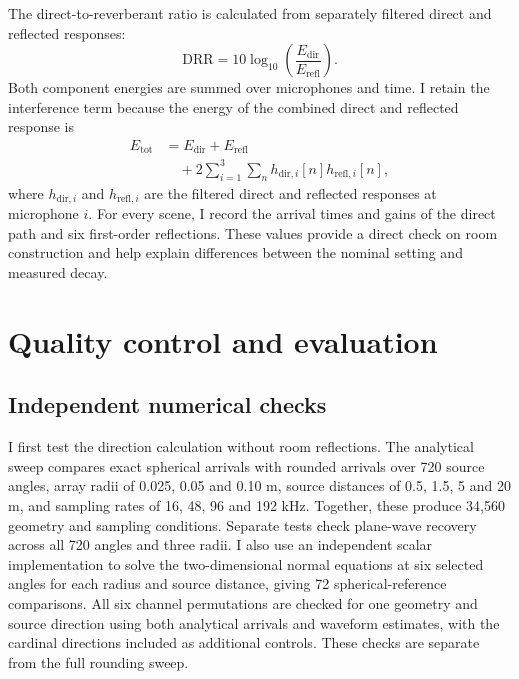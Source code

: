\documentclass{edpsci}
\begin{document}
The direct-to-reverberant ratio is calculated from separately filtered direct and reflected responses:
\begin{equation}
	\mathrm{DRR}
	=
	10\log_{10}
	\left(
	\frac{E_{\mathrm{dir}}}{E_{\mathrm{refl}}}
	\right).
\end{equation}
Both component energies are summed over microphones and time. I retain the interference term because the energy of the combined direct and reflected response is
\begin{equation}
	\begin{aligned}
	E_{\mathrm{tot}} &= E_{\mathrm{dir}}+E_{\mathrm{refl}}\\
	&\quad+2\sum_{i=1}^{3}\sum_n
	h_{\mathrm{dir},i}[n]h_{\mathrm{refl},i}[n],
	\end{aligned}
\end{equation}
where $h_{\mathrm{dir},i}$ and $h_{\mathrm{refl},i}$ are the filtered direct and reflected responses at microphone $i$.
For every scene, I record the arrival times and gains of the direct path and six first-order reflections. These values provide a direct check on room construction and help explain differences between the nominal setting and measured decay.

\section{Quality control and evaluation}

\subsection{Independent numerical checks}

I first test the direction calculation without room reflections. The analytical sweep compares exact spherical arrivals with rounded arrivals over 720 source angles, array radii of 0.025, 0.05 and 0.10 m, source distances of 0.5, 1.5, 5 and 20 m, and sampling rates of 16, 48, 96 and 192 kHz. Together, these produce 34,560 geometry and sampling conditions. Separate tests check plane-wave recovery across all 720 angles and three radii. I also use an independent scalar implementation to solve the two-dimensional normal equations at six selected angles for each radius and source distance, giving 72 spherical-reference comparisons. All six channel permutations are checked for one geometry and source direction using both analytical arrivals and waveform estimates, with the cardinal directions included as additional controls. These checks are separate from the full rounding sweep.
\end{document}
